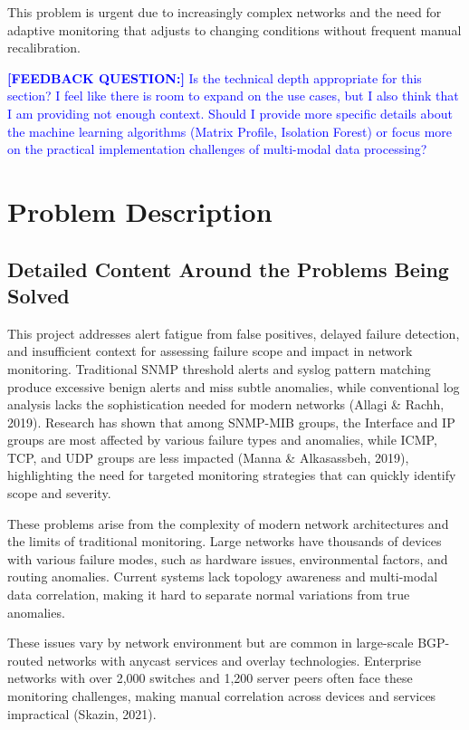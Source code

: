\documentclass[11pt]{article}
\begin{document}
This problem is urgent due to increasingly complex networks and the need for adaptive monitoring that adjusts to changing conditions without frequent manual recalibration.

\textcolor{blue}{\textbf{[FEEDBACK QUESTION:]} Is the technical depth appropriate for this section? I feel like there is room to expand on the use cases, but I also think that I am providing not enough context. Should I provide more specific details about the machine learning algorithms (Matrix Profile, Isolation Forest) or focus more on the practical implementation challenges of multi-modal data processing?}

\section{Problem Description}

\subsection{Detailed Content Around the Problems Being Solved}

This project addresses alert fatigue from false positives, delayed failure detection, and insufficient context for assessing failure scope and impact in network monitoring. Traditional SNMP threshold alerts and syslog pattern matching produce excessive benign alerts and miss subtle anomalies, while conventional log analysis lacks the sophistication needed for modern networks (Allagi \& Rachh, 2019). Research has shown that among SNMP-MIB groups, the Interface and IP groups are most affected by various failure types and anomalies, while ICMP, TCP, and UDP groups are less impacted (Manna \& Alkasassbeh, 2019), highlighting the need for targeted monitoring strategies that can quickly identify scope and severity.

These problems arise from the complexity of modern network architectures and the limits of traditional monitoring. Large networks have thousands of devices with various failure modes, such as hardware issues, environmental factors, and routing anomalies. Current systems lack topology awareness and multi-modal data correlation, making it hard to separate normal variations from true anomalies.

These issues vary by network environment but are common in large-scale BGP-routed networks with anycast services and overlay technologies. Enterprise networks with over 2,000 switches and 1,200 server peers often face these monitoring challenges, making manual correlation across devices and services impractical (Skazin, 2021).
\end{document}
